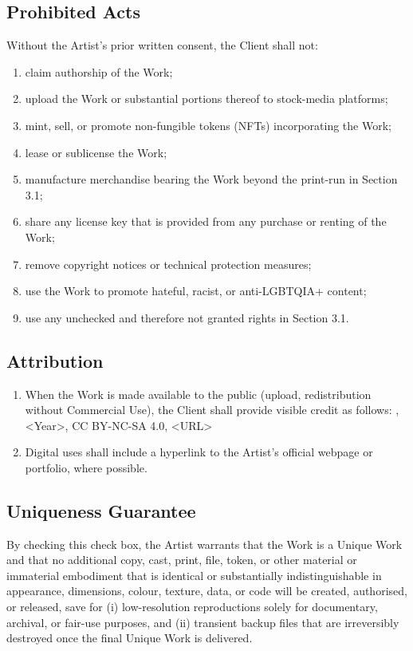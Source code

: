 \subsection{Prohibited Acts}
Without the Artist's prior written consent, the Client shall not:
\begin{enumerate}[label=(\alph*)]
    \item claim authorship of the Work;
    \item upload the Work or substantial portions thereof to stock-media 
        platforms;
    \item mint, sell, or promote non-fungible tokens (NFTs) incorporating the 
        Work;
    \item lease or sublicense the Work;
    \item manufacture merchandise bearing the Work beyond the print-run in 
        Section 3.1;
    \item share any license key that is provided from any purchase or renting of 
        the Work;
    \item remove copyright notices or technical protection measures;
    \item use the Work to promote hateful, racist, or anti-LGBTQIA+ content;
    \item use any unchecked and therefore not granted rights in Section 3.1.
\end{enumerate}


\subsection{Attribution}
\begin{enumerate}[label=(\alph*)]
    \item When the Work is made available to the public (upload, redistribution 
        without Commercial Use), the Client shall provide visible credit as 
        follows:
        \doclicensor, <Year>, CC BY-NC-SA 4.0, <URL>
    \item Digital uses shall include a hyperlink to the Artist's official 
        webpage or portfolio, where possible.
\end{enumerate}


\subsection{Uniqueness Guarantee}
\CheckBox[name=uniquebox, width=0.8em, height=0.5em]{}
By checking this check box, the Artist warrants that the Work is a Unique 
Work and that no additional copy, cast, print, file, token, or other 
material or immaterial embodiment that is identical or substantially 
indistinguishable in appearance, dimensions, colour, texture, data, or code 
will be created, authorised, or released, save for 
(i) low-resolution reproductions solely for documentary, archival, or 
fair-use purposes, and (ii) transient backup files that are irreversibly 
destroyed once the final Unique Work is delivered.

